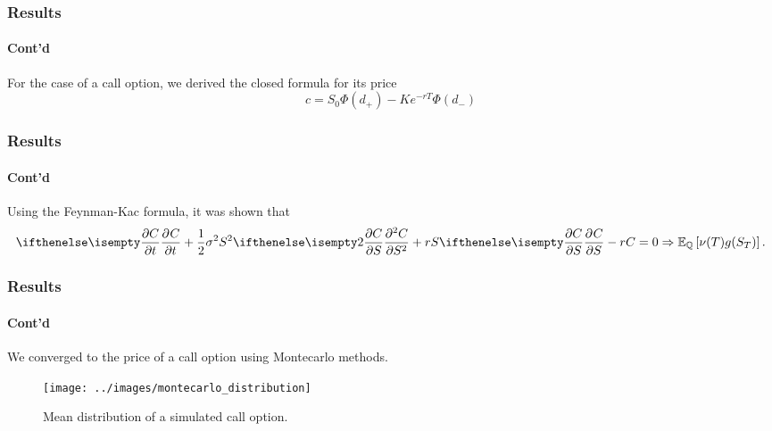 \documentclass{beamer}
\begin{document}
\begin{frame}
	\frametitle{Results}
	\framesubtitle{Cont'd}
	For the case of a call option, we derived the closed formula for its price
	\begin{equation} \label{eq:risk-neutral-price}
		c = S_0 \Phi(d_+) - Ke^{-rT}\Phi(d_-)
	\end{equation}
\end{frame}

\begin{frame}
	\frametitle{Results}
	\framesubtitle{Cont'd}
	Using the Feynman-Kac formula, it was shown that
	\begin{equation}
		\partialwrt{C}{t} + \frac{1}{2}\sigma^2S^2\partialwrt[2]{C}{S} + rS\partialwrt{C}{S} - rC = 0 \Rightarrow \ExpMeasure{\Qm}{\nu(T)g(S_T)}.
	\end{equation}
\end{frame}


\begin{frame}
	\frametitle{Results}
	\framesubtitle{Cont'd}
	We converged to the price of a call option using Montecarlo methods.
		\begin{figure}[h]
		\centering
	  \texttt{[image: ../images/montecarlo\_distribution]}
	  \caption{Mean distribution of a simulated call option.}
	\end{figure}
\end{frame}


\begin{frame}[allowframebreaks]
\tiny
\nocite{*}

\end{frame}
\end{document}
